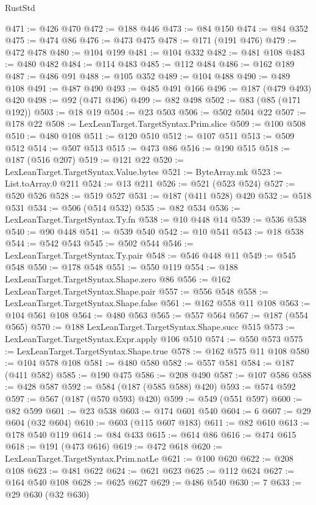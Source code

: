 \begin{lexlean}{RustStd}
\begin{coremodule}
@471 := @426 @470
@472 := @188 @446
@473 := @84 @150
@474 := @84 @352
@475 := @474 @86
@476 := @473 @475
@478 := @171 (@191 @476)
@479 := @472 @478
@480 := @104 @199
@481 := @104 @332
@482 := @481 @108
@483 := @480 @482
@484 := @114 @483
@485 := @112 @484
@486 := @162 @189
@487 := @486 @91
@488 := @105 @352
@489 := @104 @488
@490 := @489 @108
@491 := @487 @490
@493 := @485 @491 @166
@496 := @187 (@479 @493) @420
@498 := @92 (@471 @496)
@499 := @82 @498
@502 := @83 (@85 (@171 @192))
@503 := @18 @19
@504 := @23 @503
@506 := @502 @504 @22
@507 := @178 @22
@508 := LexLeanTarget.TargetSyntax.Prim.slice
@509 := @100 @508
@510 := @480 @108
@511 := @120 @510
@512 := @107 @511
@513 := @509 @512
@514 := @507 @513
@515 := @473 @86
@516 := @190 @515
@518 := @187 (@516 @207)
@519 := @121 @22
@520 := LexLeanTarget.TargetSyntax.Value.bytes
@521 := ByteArray.mk
@523 := List.toArray.{0} @211
@524 := @13 @211
@526 := @521 (@523 @524)
@527 := @520 @526
@528 := @519 @527
@531 := @187 (@411 @528) @420
@532 := @518 @531
@534 := @506 (@514 @532)
@535 := @82 @534
@536 := LexLeanTarget.TargetSyntax.Ty.fn
@538 := @10 @448 @14
@539 := @536 @538
@540 := @90 @448
@541 := @539 @540
@542 := @10 @541
@543 := @18 @538
@544 := @542 @543
@545 := @502 @544
@546 := LexLeanTarget.TargetSyntax.Ty.pair
@548 := @546 @448 @11
@549 := @545 @548
@550 := @178 @548
@551 := @550 @119
@554 := @188 LexLeanTarget.TargetSyntax.Shape.zero @86
@556 := @162 LexLeanTarget.TargetSyntax.Shape.pair
@557 := @556 @548
@558 := LexLeanTarget.TargetSyntax.Shape.false
@561 := @162 @558 @11 @108
@563 := @104 @561 @108
@564 := @480 @563
@565 := @557 @564
@567 := @187 (@554 @565)
@570 := @188 LexLeanTarget.TargetSyntax.Shape.succ @515
@573 := LexLeanTarget.TargetSyntax.Expr.apply @106 @510
@574 := @550 @573
@575 := LexLeanTarget.TargetSyntax.Shape.true
@578 := @162 @575 @11 @108
@580 := @104 @578 @108
@581 := @480 @580
@582 := @557 @581
@584 := @187 (@411 @582)
@585 := @190 @475
@586 := @208 @490
@587 := @107 @586
@588 := @428 @587
@592 := @584 (@187 (@585 @588) @420)
@593 := @574 @592
@597 := @567 (@187 (@570 @593) @420)
@599 := @549 (@551 @597)
@600 := @82 @599
@601 := @23 @538
@603 := @174 @601 @540
@604 := 6
@607 := @29 @604 (@32 @604)
@610 := @603 (@115 @607 @183)
@611 := @82 @610
@613 := @178 @540 @119
@614 := @84 @433
@615 := @614 @86
@616 := @474 @615
@618 := @191 (@473 @616)
@619 := @472 @618
@620 := LexLeanTarget.TargetSyntax.Prim.natLe
@621 := @100 @620
@622 := @208 @108
@623 := @481 @622
@624 := @621 @623
@625 := @112 @624
@627 := @164 @540 @108
@628 := @625 @627
@629 := @486 @540
@630 := 7
@633 := @29 @630 (@32 @630)

\end{coremodule}
\end{lexlean}
